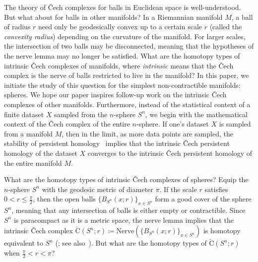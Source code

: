 \documentclass[11 pt,a4paper,twoside,reqno]{amsart}
\theoremstyle{definition}
\newcommand{\cech}[2]{\mathrm{\check{C}}(#1;#2)}
\begin{document}
The theory of \v{C}ech complexes for balls in Euclidean space is well-understood.
But what about for balls in other manifolds?
In a Riemannian manifold $M$, a ball of radius $r$ need only be geodesically convex up to a certain scale $r$ (called the \emph{convexity radius}) depending on the curvature of the manifold.
For larger scales, the intersection of two balls may be disconnected, meaning that the hypotheses of the nerve lemma may no longer be satisfied.
What are the homotopy types of intrinsic \v{C}ech complexes of manifolds, where \emph{intrinsic} means that the \v{C}ech complex is the nerve of balls restricted to live in the manifold?
In this paper, we initiate the study of this question for the simplest non-contractible manifolds: spheres.
We hope our paper inspires follow-up work on the intrinsic \v{C}ech complexes of other manifolds.
Furthermore, instead of the statistical context of a finite dataset $X$ sampled from the $n$-sphere $S^n$, 
we begin with the mathematical context of the \v{C}ech complex of the entire $n$-sphere.
If one's dataset $X$ is sampled from a manifold $M$, then in the limit, as more data points are sampled, the stability of persistent homology~\cite{ChazalDeSilvaOudot2014} implies that the intrinsic \v{C}ech persistent homology of the dataset $X$ converges to the intrinsic \v{C}ech persistent homology of the entire manifold $M$.

What are the homotopy types of intrinsic \v{C}ech complexes of spheres?
Equip the $n$-sphere $S^n$ with the geodesic metric of diameter $\pi$.
If the scale $r$ satisfies $0<r\le\frac{\pi}{2}$, then the open balls $\{B_{S^n}(x;r)\}_{x\in S^n}$ form a good cover of the sphere $S^n$, meaning that any intersection of balls is either empty or contractible.
Since $S^n$ is paracompact as it is a metric space, the nerve lemma implies that the intrinsic \v{C}ech complex $\cech{S^n}{r}\coloneqq \mathrm{Nerve}(\{B_{S^n}(x;r)\}_{x\in S^n})$ is homotopy equivalent to $S^n$ (\cite[Theorem~4G.3]{Hatcher}; see also~\cite[Theorem~13.1.3]{tom2008algebraic}).
But what are the homotopy types 
of $\cech{S^n}{r}$ when $\frac{\pi}{2}<r<\pi$?
\end{document}
